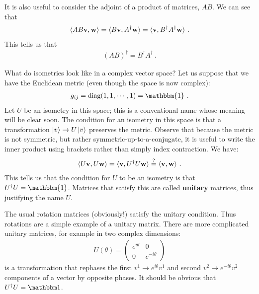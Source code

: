 \documentclass[12pt, oneside]{report}    %
\begin{document}
It is also useful to consider the adjoint of a product of matrices, $AB$. We can see that
\begin{align}
    \langle AB \mathbf{v}, \mathbf{w} \rangle
    =
    \langle B \mathbf{v},  A^\dag \mathbf{w} \rangle
    =
    \langle \mathbf{v}, B^\dag A^\dag \mathbf{w} \rangle \ .
\end{align}
This tells us that
\begin{align}
    (AB)^\dag = B^\dag A^\dag \ .
    \label{eq:adjoint:of:product}
\end{align}



\begin{example} What do isometries look like in a complex vector space? Let us suppose that we have the Euclidean metric (even though the space is now complex):
\begin{align}
    g_{ij} = \text{diag}(1,1,\cdots, 1) = \mathbbm{1} \ .
\end{align}
Let $U$ be an isometry in this space; this is a conventional name whose meaning will be clear soon. The condition for an isometry in this space is that a transformation $\left|v\right\rangle \to U\left|v\right\rangle$ preserves the metric. Observe that because the metric is not symmetric, but rather symmetric-up-to-a-conjugate, it is useful to write the inner product using brackets rather than simply index contraction. We have:
\begin{align}
    \langle U\mathbf{v}, U\mathbf{w} \rangle = \langle \mathbf{v}, U^\dag U \mathbf{w} \rangle \stackrel{?}{=} \langle \mathbf{v}, \mathbf{w} \rangle \ .
\end{align}
This tells us that the condition for $U$ to be an isometry is that $U^\dag U = \mathbbm{1}$. Matrices that satisfy this are called \textbf{unitary} matrices, thus justifying the name $U$. 
\end{example}

\begin{example}
The usual rotation matrices (obviously!) satisfy the unitary condition. Thus rotations are a simple example of a unitary matrix. There are more complicated unitary matrices, for example in two complex dimensions:
\begin{align}
    U(\theta) = 
    \begin{pmatrix}
        e^{i\theta} & 0\\
        0 & e^{-i\theta}
    \end{pmatrix}
    \label{eg:unitary:matrix:diagonal}
\end{align}
is a transformation that rephases the first $v^1 \to e^{i\theta}v^1$  and second $v^2 \to e^{-i\theta}v^2$ components of a vector by opposite phases. It should be obvious that $U^\dag U = \one$. 
\end{example}
\end{document}
